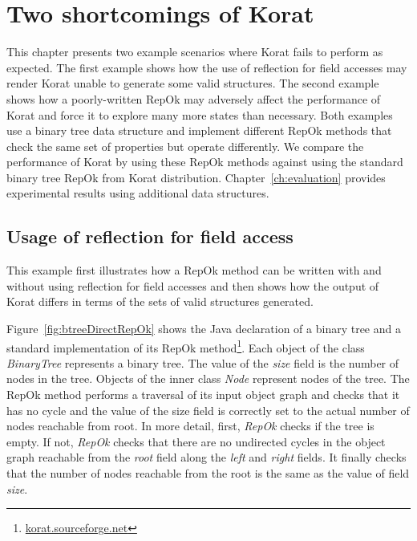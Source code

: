 \chapter{Two shortcomings of Korat}
\label{ch:shortcomings-of-korat}
This chapter presents two example scenarios where
Korat fails to perform as expected.  The first
example shows how the use of reflection for field accesses may render
Korat unable to generate some valid structures.  The second example
shows how a poorly-written RepOk may adversely affect the performance
of Korat and force it to explore many more states than necessary.
Both examples use a binary tree data structure and implement different
RepOk methods that check the same set of properties but operate
differently.  We compare the performance of Korat by using these RepOk
methods against using the standard binary tree RepOk from Korat
distribution.  Chapter~\ref{ch:evaluation} provides experimental
results using additional data structures.

\section{Usage of reflection for field access}
\label{sec:usage-of-reflection-for-field-access}
This example first illustrates how a RepOk method can be written with
and without using reflection for field accesses and then shows how the
output of Korat differs in terms of the sets of valid structures
generated.

\para
Figure~\ref{fig:btreeDirectRepOk} shows the Java declaration of a
binary tree and a standard implementation of its RepOk
method\footnote{\url{korat.sourceforge.net}}. Each object of the class
\emph{BinaryTree} represents a binary tree. The value of the
\emph{size} field is the number of nodes in the tree. Objects of the
inner class \emph{Node} represent nodes of the tree.  The RepOk method
performs a traversal of its input object graph and checks that it has
no cycle and the value of the size field is correctly set to the
actual number of nodes reachable from root.  In more detail, first,
\emph{RepOk} checks if the tree is empty. If not, \emph{RepOk} checks
that there are no undirected cycles in the object graph reachable from
the \emph{root} field along the \emph{left} and \emph{right}
fields. It finally checks that the number of nodes reachable from the
root is the same as the value of field \emph{size}.

